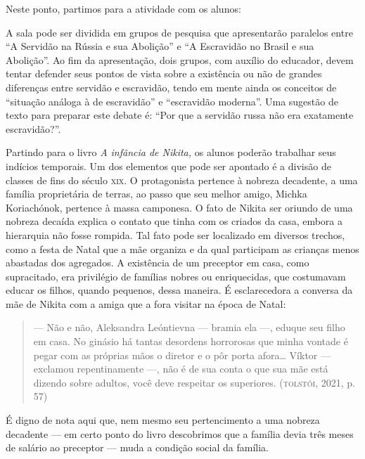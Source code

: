 \documentclass[11pt]{extarticle}
\begin{document}
Neste ponto, partimos para a atividade com os alunos:

A sala pode ser dividida em grupos de pesquisa que apresentarão
paralelos entre ``A Servidão na Rússia e sua Abolição'' e ``A Escravidão
no Brasil e sua Abolição''. Ao fim da apresentação, dois grupos, com
auxílio do educador, devem tentar defender seus pontos de vista sobre a
existência ou não de grandes diferenças entre servidão e escravidão,
tendo em mente ainda os conceitos de ``situação análoga à de
escravidão'' e ``escravidão moderna''. Uma sugestão de texto para
preparar este debate é: ``Por que a servidão russa não era exatamente
escravidão?''.


Partindo para o livro \emph{A infância de Nikita,} os alunos poderão
trabalhar seus indícios temporais. Um dos elementos que pode ser
apontado é a divisão de classes de fins do século \textsc{xix}. O protagonista
pertence à nobreza decadente, a uma família proprietária de terras, ao
passo que seu melhor amigo, Michka Koriachónok, pertence à massa
camponesa. O fato de Nikita ser oriundo de uma nobreza decaída explica o
contato que tinha com os criados da casa, embora a hierarquia não fosse
rompida. Tal fato pode ser localizado em diversos trechos, como a festa
de Natal que a mãe organiza e da qual participam as crianças menos
abastadas dos agregados. A existência de um preceptor em casa, como
supracitado, era privilégio de famílias nobres ou enriquecidas, que
costumavam educar os filhos, quando pequenos, dessa maneira. É
esclarecedora a conversa da mãe de Nikita com a amiga que a fora visitar
na época de Natal:

\begin{quote}
--- Não e não, Aleksandra Leóntievna --- bramia ela ---, eduque seu
filho em casa. No ginásio há tantas desordens horrorosas que minha
vontade é pegar com as próprias mãos o diretor e o pôr porta afora\ldots{}
Víktor --- exclamou repentinamente ---, não é de sua conta o que sua mãe
está dizendo sobre adultos, você deve respeitar os superiores.
(\textsc{tolstói}, 2021, p. 57)
\end{quote}

É digno de nota aqui que, nem mesmo seu pertencimento a uma nobreza
decadente --- em certo ponto do livro descobrimos que a família devia
três meses de salário ao preceptor --- muda a condição social da
família.
\end{document}
